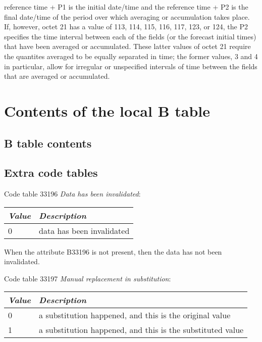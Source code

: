 \documentclass[draft,12pt,a4paper,twoside]{book}
\begin{document}
\begin{itemize}
      reference time + P1  is the initial date/time and the reference time + P2
      is the final date/time of the period over which averaging or accumulation
      takes place. If, however, octet 21 has a value of 113, 114, 115, 116,
      117, 123, or 124, the P2 specifies the time interval between each of the
      fields (or the forecast initial times) that have been averaged or
      accumulated. These latter values of octet 21 require the quantites
      averaged to be equally separated in time; the former values, 3 and 4 in
      particular, allow for irregular or unspecified intervals of time between
      the fields that are averaged or accumulated.
\end{itemize}


\chapter{Contents of the local B table}

\section{B table contents}

\label{btable}


\section{Extra code tables}

Code table 33196 \emph{Data has been invalidated}:

\begin{tabular}{|l|l|}
\hline
{\em Value} & {\em Description}               \\
\hline
          0 & data has been invalidated       \\
\hline
\end{tabular}

When the attribute B33196 is not present, then the data has not been
invalidated.

Code table 33197 \emph{Manual replacement in substitution}:

\begin{tabular}{|l|l|}
\hline
{\em Value} & {\em Description}               \\
\hline
          0 & a substitution happened, and this is the original value    \\
          1 & a substitution happened, and this is the substituted value \\
\hline
\end{tabular}
\end{document}
